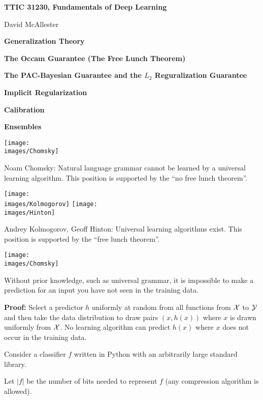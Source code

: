 




{\Huge


\centerline{\bf TTIC 31230, Fundamentals of Deep Learning}
\bigskip
\centerline{David McAllester}

\vfill
\centerline{\bf Generalization Theory}
\vfill
\centerline{\bf The Occam Guarantee (The Free Lunch Theorem)}
\vfill
\centerline{\bf The PAC-Bayesian Guarantee and the $L_2$ Reguralization Guarantee}
\vfill
\centerline{\bf Implicit Regularization}
\vfill
\centerline{\bf Calibration}
\vfill
\centerline{\bf Ensembles}
\vfill
{}

\vfill
\vfill


\texttt{[image: \\images/Chomsky]} \begin{minipage}[b]{8in} Noam Chomsky: 
Natural language grammar cannot be learned by a universal learning algorithm.
This position is supported by the ``no free lunch theorem''.\end{minipage}

\vfill
\texttt{[image: \\images/Kolmogorov]}
\texttt{[image: \\images/Hinton]}
\begin{minipage}[b]{7in}
Andrey Kolmogorov, Geoff Hinton: Universal learning algorithms exist. This position is supported by the ``free lunch theorem''.
\end{minipage}


\texttt{[image: \\images/Chomsky]} 

Without prior knowledge, such as universal grammar, it is impossible to make a prediction for an input you have not seen in the training data.


\vfill
{\bf Proof:} Select a predictor $h$ uniformly at random from all functions from ${\cal X}$ to ${\cal Y}$ and then take the data distribution to draw pairs $(x, h(x))$
where $x$ is drawn uniformly from ${\cal X}$.  No learning algorithm can predict $h(x)$ where $x$ does not occur in the training data.



Consider a classifier $f$ written in Python with an arbitrarily large standard library.

\vfill
Let $|f|$ be the number of bits needed to represent $f$ (any compression algorithm is allowed).

}
